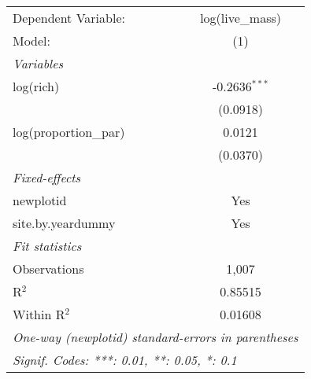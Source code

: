 \begin{tabular}{lc}
\tabularnewline\midrule\midrule
Dependent Variable:&log(live\_mass)\\
Model:&(1)\\
\midrule \emph{Variables}&  \\
log(rich)&-0.2636$^{***}$\\
  &(0.0918)\\
log(proportion\_par)&0.0121\\
  &(0.0370)\\
\midrule \emph{Fixed-effects}&  \\
newplotid & Yes\\
site.by.yeardummy & Yes\\
\midrule \emph{Fit statistics}&  \\
Observations & 1,007\\
R$^2$ & 0.85515\\
Within R$^2$ & 0.01608\\
\midrule\midrule\multicolumn{2}{l}{\emph{One-way (newplotid) standard-errors in parentheses}}\\
\multicolumn{2}{l}{\emph{Signif. Codes: ***: 0.01, **: 0.05, *: 0.1}}\\
\end{tabular}


